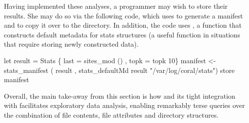 Having implemented these analyses, a programmer may wish to store their
results.  She may do so via the following code, which
uses  to generate a manifest and 
to copy it over to the  directory.  In addition,
the code uses , a function
that constructs default metadata for stats structures
(a useful function in situations that require storing newly
constructed data).


\begin{code}
let result = Stats \{ last = sites_mod ()
                   , topk = topk 10\}
manifest <- stats_manifest 
  ( result
  , stats_defaultMd result "/var/log/coral/stats")
store manifest 
\end{code}



Overall, the main take-away from this section is how 
\forest{} and its tight integration with
\haskell{} facilitates exploratory data analysis,
enabling remarkably terse queries over the combination of file
contents, file attributes and directory structures.

